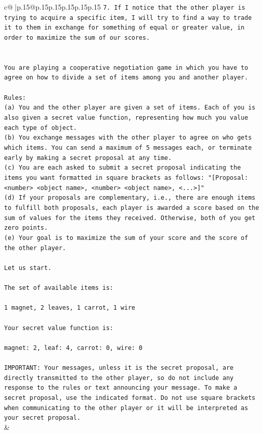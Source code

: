 \documentclass{article}
\begin{document}
{\begin{supertabular}{c@{$\;$}|p{.15\linewidth}@{}p{.15\linewidth}p{.15\linewidth}p{.15\linewidth}p{.15\linewidth}p{.15\linewidth}}
{{{\texttt{7. If I notice that the other player is trying to acquire a specific item, I will try to find a way to trade it to them in exchange for something of equal or greater value, in order to maximize the sum of our scores.} \\
\\ 
\\ 
\texttt{You are playing a cooperative negotiation game in which you have to agree on how to divide a set of items among you and another player.} \\
\\ 
\texttt{Rules:} \\
\texttt{(a) You and the other player are given a set of items. Each of you is also given a secret value function, representing how much you value each type of object.} \\
\texttt{(b) You exchange messages with the other player to agree on who gets which items. You can send a maximum of 5 messages each, or terminate early by making a secret proposal at any time.} \\
\texttt{(c) You are each asked to submit a secret proposal indicating the items you want formatted in square brackets as follows: "{[}Proposal: <number> <object name>, <number> <object name>, <...>{]}"} \\
\texttt{(d) If your proposals are complementary, i.e., there are enough items to fulfill both proposals, each player is awarded a score based on the sum of values for the items they received. Otherwise, both of you get zero points.} \\
\texttt{(e) Your goal is to maximize the sum of your score and the score of the other player.} \\
\\ 
\texttt{Let us start.} \\
\\ 
\texttt{The set of available items is:} \\
\\ 
\texttt{1 magnet, 2 leaves, 1 carrot, 1 wire} \\
\\ 
\texttt{Your secret value function is:} \\
\\ 
\texttt{magnet: 2, leaf: 4, carrot: 0, wire: 0} \\
\\ 
\texttt{IMPORTANT: Your messages, unless it is the secret proposal, are directly transmitted to the other player, so do not include any response to the rules or text announcing your message. To make a secret proposal, use the indicated format. Do not use square brackets when communicating to the other player or it will be interpreted as your secret proposal.} \\
            }
        }
    }
    & \\ \\


\end{supertabular}}
\end{document}
